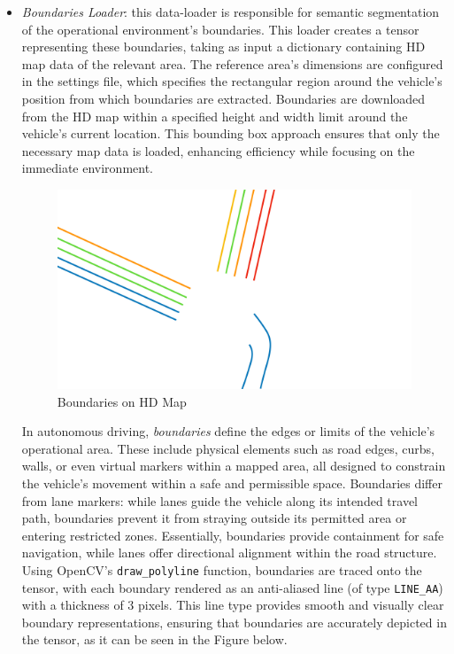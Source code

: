 \begin{itemize}
    \item \textit{Boundaries Loader}: this data-loader is responsible for semantic segmentation of the operational environment’s boundaries. This loader creates a tensor representing these boundaries, taking as input a dictionary containing HD map data of the relevant area. The reference area’s dimensions are configured in the settings file, which specifies the rectangular region around the vehicle’s position from which boundaries are extracted.
    Boundaries are downloaded from the HD map within a specified height and width limit around the vehicle's current location. This bounding box approach ensures that only the necessary map data is loaded, enhancing efficiency while focusing on the immediate environment.
    \begin{figure}[H]
        \centering
        \includegraphics[width=0.75\linewidth]{LateX//figs/mappaHD.pdf}
        \caption{Boundaries on HD Map}
        \label{fig:hd-map-boundaries}
    \end{figure}
    In autonomous driving, \textit{boundaries} define the edges or limits of the vehicle's operational area. These include physical elements such as road edges, curbs, walls, or even virtual markers within a mapped area, all designed to constrain the vehicle’s movement within a safe and permissible space. Boundaries differ from lane markers: while lanes guide the vehicle along its intended travel path, boundaries prevent it from straying outside its permitted area or entering restricted zones. Essentially, boundaries provide containment for safe navigation, while lanes offer directional alignment within the road structure.
    Using OpenCV’s \texttt{draw\_polyline} function, boundaries are traced onto the tensor, with each boundary rendered as an anti-aliased line (of type \texttt{LINE\_AA}) with a thickness of 3 pixels. This line type provides smooth and visually clear boundary representations, ensuring that boundaries are accurately depicted in the tensor, as it can be seen in the Figure below.

\end{itemize}
